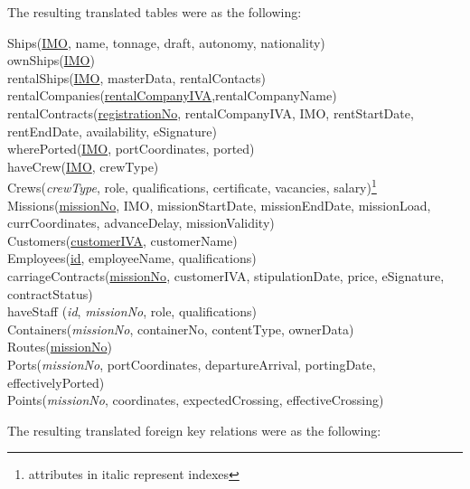 \documentclass[12pt]{scrartcl}
\makeatletter
\newcommand\footnoteref[1]{\protected@xdef\@thefnmark{\ref{#1}}\@footnotemark}
\makeatother
\begin{document}
The resulting translated tables were as the following:
\begin{flushleft}
	Ships(\underline{IMO}, name, tonnage, draft, autonomy, nationality)\\
	ownShips(\underline{IMO})\\
	rentalShips(\underline{IMO}, masterData, rentalContacts)\\
	rentalCompanies(\underline{rentalCompanyIVA},rentalCompanyName)\\
	rentalContracts(\underline{registrationNo}, rentalCompanyIVA, IMO, rentStartDate, rentEndDate, availability, eSignature)\\
	wherePorted(\underline{IMO}, portCoordinates, ported)\\
	haveCrew(\underline{IMO}, crewType)\\
	Crews(\textit{crewType}, role, qualifications, certificate, vacancies, salary)\footnote{\label{italic1}attributes in italic represent indexes}\\
	Missions(\underline{missionNo}, IMO, missionStartDate, missionEndDate, missionLoad, currCoordinates, advanceDelay, missionValidity)\\
	Customers(\underline{customerIVA}, customerName)\\
	Employees(\underline{id}, employeeName, qualifications)\\
	carriageContracts(\underline{missionNo}, customerIVA, stipulationDate, price, eSignature, contractStatus)\\
	haveStaff (\textit{id}, \textit{missionNo}, role, qualifications)\footnoteref{italic1}\\
	Containers(\textit{missionNo}, containerNo, contentType, ownerData)\footnoteref{italic1}\\
	Routes(\underline{missionNo})\\
	Ports(\textit{missionNo}, portCoordinates, departureArrival, portingDate, effectivelyPorted)\footnoteref{italic1}\\
	Points(\textit{missionNo}, coordinates, expectedCrossing, effectiveCrossing)\footnoteref{italic1}\\
\end{flushleft}
\newpage
The resulting translated foreign key relations were as the following:
\end{document}
